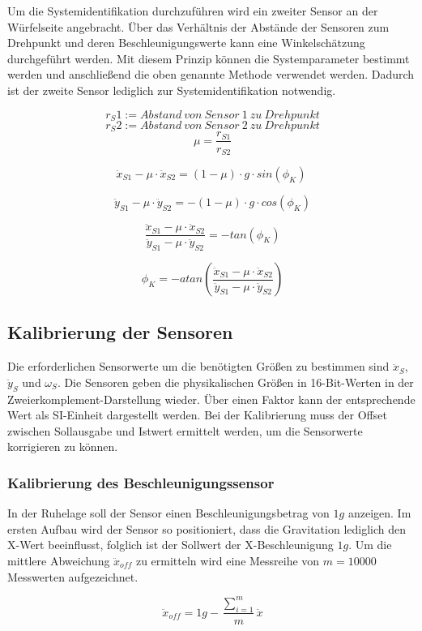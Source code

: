 \documentclass{article}
\begin{document}
Um die Systemidentifikation durchzuführen wird ein zweiter Sensor an der Würfelseite angebracht. Über das Verhältnis der Abstände der Sensoren zum Drehpunkt und deren Beschleunigungswerte kann eine Winkelschätzung durchgeführt werden. Mit diesem Prinzip können die Systemparameter bestimmt werden und anschließend die oben genannte Methode verwendet werden. Dadurch ist der zweite Sensor lediglich zur Systemidentifikation notwendig.

\[\ r_S1 := Abstand \ von \ Sensor \ 1 \ zu \ Drehpunkt \]
\[\ r_S2 := Abstand \ von \ Sensor \ 2 \ zu \ Drehpunkt \]
\[\ \mu = \frac{r_{S1}}{r_{S2}} \]

\[ \ddot{x}_{S1} - \mu \cdot \ddot{x}_{S2} = (1 - \mu) \cdot g \cdot sin(\phi_K) \]

\[\ \ddot{y}_{S1} - \mu \cdot \ddot{y}_{S2} = - (1 - \mu) \cdot g \cdot cos(\phi_K) \]

\[\ \frac{\ddot{x}_{S1} - \mu \cdot \ddot{x}_{S2}}{\ddot{y}_{S1} - \mu \cdot \ddot{y}_{S2}} = 
-tan(\phi_K) \]

\[\ \phi_K = - atan(\frac{\ddot{x}_{S1} - \mu \cdot \ddot{x}_{S2}}{\ddot{y}_{S1} - \mu \cdot \ddot{y}_{S2}}) \]


\subsection{Kalibrierung der Sensoren}
Die erforderlichen Sensorwerte um die benötigten Größen zu bestimmen sind $\ddot{x}_S$, $\ddot{y}_S$ und $\omega_S$. Die Sensoren geben die physikalischen Größen in 16-Bit-Werten in der Zweierkomplement-Darstellung wieder. Über einen Faktor kann der entsprechende Wert als SI-Einheit dargestellt werden. Bei der Kalibrierung muss der Offset zwischen Sollausgabe und Istwert ermittelt werden, um die Sensorwerte korrigieren zu können.

\subsubsection{Kalibrierung des Beschleunigungssensor}
In der Ruhelage soll der Sensor einen Beschleunigungsbetrag von $1g$ anzeigen. Im ersten Aufbau wird der Sensor so positioniert, dass die Gravitation lediglich den X-Wert beeinflusst, folglich ist der Sollwert der X-Beschleunigung $1g$. Um die mittlere Abweichung $\ddot{x}_{off}$ zu ermitteln wird eine Messreihe von $m = 10000$ Messwerten aufgezeichnet. 

\[\ \ddot{x}_{off} = 1g - \frac{\sum_{i = 1}^{m}}{m} \ddot{x} \]
\end{document}
